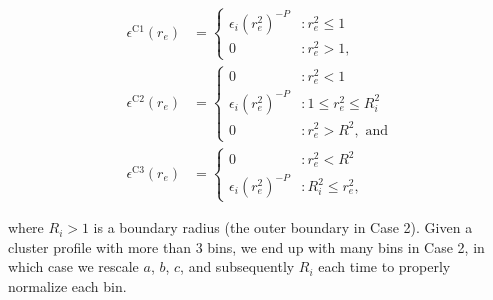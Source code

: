 \documentclass[twocolumn,traditabstract]{aa}
\begin{document}
\begin{align}
  \epsilon^{\text{C1}}(r_e) &= \begin{cases}
    \epsilon_i (r_e^2)^{-P} &: r_e^2 \leq 1 \\
                        0 &: r_e^2 > 1,
    \end{cases}
  \label{eqn:case1_shell} \\
  \epsilon^{\text{C2}}(r_e) &= \begin{cases}
                         0 &: r_e^2 < 1 \\
    \epsilon_i (r_e^2)^{-P} &: 1 \leq r_e^2 \leq R_i^2 \\
                         0 &: r_e^2 > R^2, \text{ and}
    \end{cases}
  \label{eqn:case2_shell} \\
  \epsilon^{\text{C3}}(r_e) &= \begin{cases}
                        0 &: r_e^2 < R^2 \\
    \epsilon_i (r_e^2)^{-P} &: R_i^2 \leq r_e^2, 
    \end{cases}
  \label{eqn:case3_shell} 
\end{align}

where $R_i > 1$ is a boundary radius (the outer boundary in Case 2). Given a cluster profile with more than 3 bins, we end
up with many bins in Case 2, in which case we rescale $a$, $b$, $c$, and subsequently $R_i$ each time to properly normalize
each bin.
\end{document}
